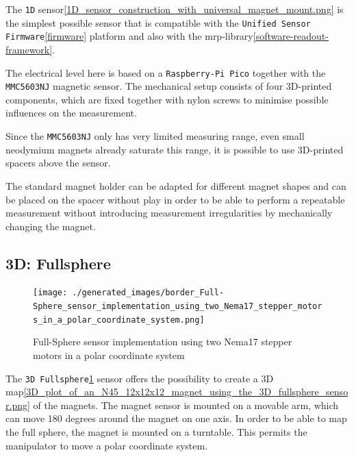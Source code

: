 The \passthrough{\lstinline!1D!}
sensor\ref{1D_sensor_construction_with_universal_magnet_mount.png} is
the simplest possible sensor that is compatible with the
\passthrough{\lstinline!Unified Sensor Firmware!}\ref{firmware} platform
and also with the \gls{mrp}-library\ref{software-readout-framework}.

The electrical level here is based on a
\passthrough{\lstinline!Raspberry-Pi Pico!} together with the
\passthrough{\lstinline!MMC5603NJ!} magnetic sensor. The mechanical
setup consists of four 3D-printed components, which are fixed together
with nylon screws to minimise possible influences on the measurement.

Since the \passthrough{\lstinline!MMC5603NJ!} only has very limited
measuring range, even small neodymium magnets already saturate this
range, it is possible to use 3D-printed spacers above the sensor.

The standard magnet holder can be adapted for different magnet shapes
and can be placed on the spacer without play in order to be able to
perform a repeatable measurement without introducing measurement
irregularities by mechanically changing the magnet.

\hypertarget{d-fullsphere}{%
\subsection{3D: Fullsphere}\label{d-fullsphere}}

\begin{figure}
\centering
\texttt{[image: ./generated\_images/border\_Full-Sphere\_sensor\_implementation\_using\_two\_Nema17\_stepper\_motors\_in\_a\_polar\_coordinate\_system.png]}
\caption{Full-Sphere sensor implementation using two Nema17 stepper
motors in a polar coordinate system
\label{Full-Sphere_sensor_implementation_using_two_Nema17_stepper_motors_in_a_polar_coordinate_system.png}}
\end{figure}

The
\passthrough{\lstinline!3D Fullsphere!}\ref{Full-Sphere_sensor_implementation_using_two_Nema17_stepper_motors_in_a_polar_coordinate_system.png}
sensor offers the possibility to create a 3D
map\ref{3D_plot_of_an_N45_12x12x12_magnet_using_the_3D_fullsphere_sensor.png}
of the magnets. The magnet sensor is mounted on a movable arm, which can
move 180 degrees around the magnet on one axis. In order to be able to
map the full sphere, the magnet is mounted on a turntable. This permits
the manipulator to move a polar coordinate system.

